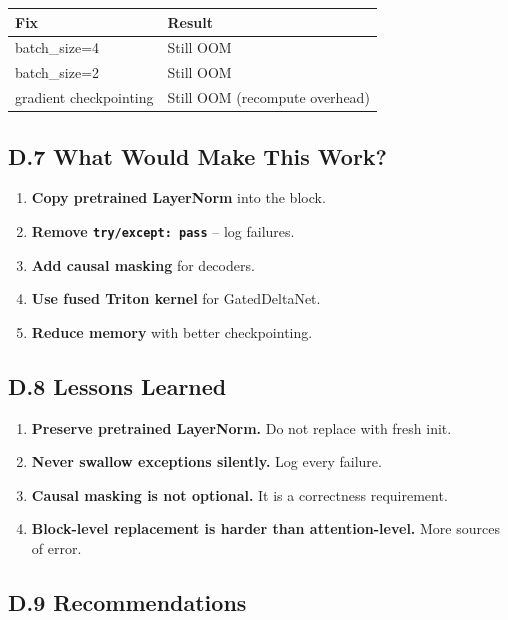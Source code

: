 \begin{table}[H]
\centering
\small
\begin{tabular}{ll}
\toprule
\textbf{Fix} & \textbf{Result} \\
\midrule
batch\_size=4 & Still OOM \\
batch\_size=2 & Still OOM \\
gradient checkpointing & Still OOM (recompute overhead) \\
\bottomrule
\end{tabular}
\end{table}

\subsection{D.7 What Would Make This Work?}

\begin{enumerate}
\item \textbf{Copy pretrained LayerNorm} into the block.
\item \textbf{Remove \texttt{try/except: pass}} -- log failures.
\item \textbf{Add causal masking} for decoders.
\item \textbf{Use fused Triton kernel} for GatedDeltaNet.
\item \textbf{Reduce memory} with better checkpointing.

\end{enumerate}
\subsection{D.8 Lessons Learned}

\begin{enumerate}
\item \textbf{Preserve pretrained LayerNorm.} Do not replace with fresh init.
\item \textbf{Never swallow exceptions silently.} Log every failure.
\item \textbf{Causal masking is not optional.} It is a correctness requirement.
\item \textbf{Block-level replacement is harder than attention-level.} More sources
  of error.

\end{enumerate}
\subsection{D.9 Recommendations}

